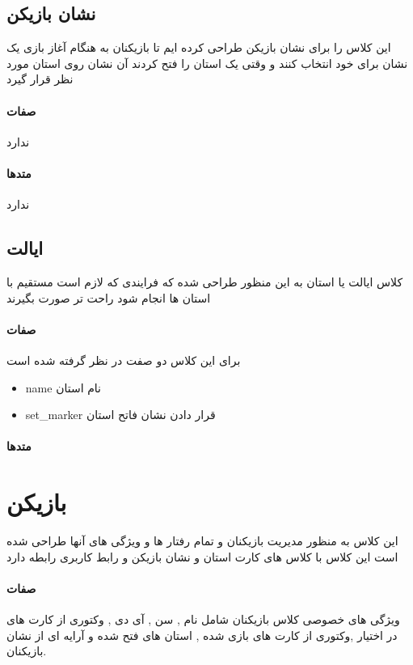 \documentclass[pdf,titlepage,a4paper]{report}
\begin{document}
	\subsection{نشان بازیکن}
	این کلاس را برای نشان بازیکن طراحی کرده ایم تا بازیکنان به هنگام آغاز بازی یک نشان برای خود انتخاب کنند و وقتی یک استان را فتح کردند آن نشان روی استان مورد نظر قرار گیرد
	\paragraph{صفات}
	ندارد
	\paragraph{متدها}
	ندارد
	
	\subsection{ایالت}
	کلاس ایالت یا استان به این منظور طراحی شده که فرایندی که لازم است مستقیم با استان ها انجام شود راحت تر صورت بگیرند 

	\paragraph{صفات}
	 برای این کلاس دو صفت در نظر گرفته شده است
	 \begin{latin}
	 	\begin{itemize}
	 		\item name نام استان 
	 		\item set\_marker قرار دادن نشان فاتح استان
	 	\end{itemize}
	 \end{latin}
	\paragraph{متدها}
	
	\section{بازیکن}
	این کلاس به منظور مدیریت بازیکنان و تمام رفتار ها و ویژگی های آنها طراحی شده است 
	 این کلاس با کلاس های کارت استان و نشان بازیکن و رابط کاربری رابطه دارد
	\paragraph{صفات}
	ویژگی های خصوصی کلاس بازیکنان شامل نام , سن , آی دی , وکتوری از کارت های در اختیار ,وکتوری از کارت های بازی شده , استان های فتح شده و آرایه ای از نشان بازیکنان.
\end{document}
